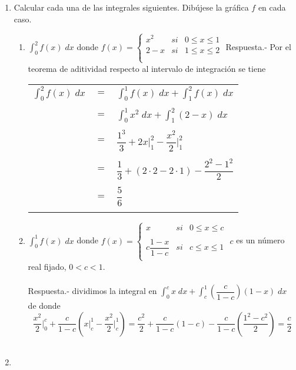 \begin{enumerate}
    \item Calcular cada una de las integrales siguientes. Dibújese la gráfica $f$ en cada caso.
	\begin{enumerate}[\bfseries (a)]

	    \item $\displaystyle\int_0^2 f(x) \; dx$ donde 
		$f(x) =  \left\{ \begin{array}{rcl}
		    x^2&si&0\leq x \leq 1\\
		    2-x&si&1\leq x\leq 2\\\\
		\end{array}\right.$
		Respuesta.-\; Por el teorema de aditividad respecto al intervalo de integración se tiene 
		\begin{center}
		    \begin{tabular}{rcl}
			$\displaystyle\int_0^2 f(x) \; dx$&$=$&$\displaystyle\int_0^1 f(x) \; dx + \int_1^2 f(x) \; dx$\\
			\\&$=$&$\displaystyle\int_0^1 x^2 \; dx + \int_1^2 (2-x) \; dx$\\
			\\&$=$&$\dfrac{1^3}{3} + 2x\bigg|_1^2  - \dfrac{x^2}{2}\bigg|_1^2$\\
			\\&$=$&$\dfrac{1}{3} + (2\cdot 2 - 2\cdot 1) - \dfrac{2^2 - 1^2}{2}$\\
			\\&$=$&$\dfrac{5}{6}$\\\\
		    \end{tabular}
		\end{center}

	    \item $\displaystyle\int_0^1 f(x)\; dx$ donde 
		$f(x) = \left\{ \begin{array}{rcl}
		    x&si&0\leq x \leq c\\
		    \\c\dfrac{1-x}{1-c}&si&c\leq x \leq 1\\
		\end{array}\right.$
		$c$ es un número real fijado, $0<c<1.$\\\\
		Respuesta.-\; dividimos la integral en $\displaystyle\int_0^c x \; dx  + \int_c^1 \left( \dfrac{c}{1-c} \right) (1-x) \; dx$ \; de donde $$\dfrac{x^2}{2}\bigg|_0^c + \dfrac{c}{1-c} \left(x \bigg|_c^1 - \dfrac{x^2}{2}\bigg|_c^1\right) = \dfrac{c^2}{2} + \dfrac{c}{1-c}(1 - c) - \dfrac{c}{1-c}\left(\dfrac{1^2 - c^2}{2}\right) = \dfrac{c}{2}$$\\

	\end{enumerate}

    \item 

\end{enumerate}
